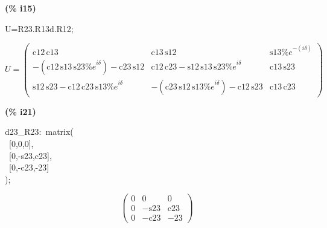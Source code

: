 \documentclass[fleqn]{article}
\begin{document}
\noindent
\begin{minipage}[t]{4.000000em}\color{red}\bfseries
(\% i15)	
\end{minipage}
\begin{minipage}[t]{\textwidth}\color{blue}
U=R23.R13d.R12;
\end{minipage}
\[\displaystyle \tag{\% o15} 
U\mathop{=}\begin{pmatrix}\ensuremath{\mathrm{c12}}\, \ensuremath{\mathrm{c13}} & \ensuremath{\mathrm{c13}}\, \ensuremath{\mathrm{s12}} & \ensuremath{\mathrm{s13}} {{\% e}^{-\left( i \delta \right) }}\\
\mathop{-}\left( \ensuremath{\mathrm{c12}}\, \ensuremath{\mathrm{s13}}\, \ensuremath{\mathrm{s23}} {{\% e}^{i \delta }}\right) \mathop{-}\ensuremath{\mathrm{c23}}\, \ensuremath{\mathrm{s12}} & \ensuremath{\mathrm{c12}}\, \ensuremath{\mathrm{c23}}\mathop{-}\ensuremath{\mathrm{s12}}\, \ensuremath{\mathrm{s13}}\, \ensuremath{\mathrm{s23}} {{\% e}^{i \delta }} & \ensuremath{\mathrm{c13}}\, \ensuremath{\mathrm{s23}}\\
\ensuremath{\mathrm{s12}}\, \ensuremath{\mathrm{s23}}\mathop{-}\ensuremath{\mathrm{c12}}\, \ensuremath{\mathrm{c23}}\, \ensuremath{\mathrm{s13}} {{\% e}^{i \delta }} & \mathop{-}\left( \ensuremath{\mathrm{c23}}\, \ensuremath{\mathrm{s12}}\, \ensuremath{\mathrm{s13}} {{\% e}^{i \delta }}\right) \mathop{-}\ensuremath{\mathrm{c12}}\, \ensuremath{\mathrm{s23}} & \ensuremath{\mathrm{c13}}\, \ensuremath{\mathrm{c23}}\end{pmatrix}\mbox{}
\]


\noindent
\begin{minipage}[t]{4.000000em}\color{red}\bfseries
(\% i21)	
\end{minipage}
\begin{minipage}[t]{\textwidth}\color{blue}
d23\_R23:\ matrix(\\
\ [0,0,0],\ \\
\ [0,-s23,c23],\ \\
\ [0,-c23,-23]\\
);
\end{minipage}
\[\displaystyle \tag{d23\_ R23} 
\begin{pmatrix}0 & 0 & 0\\
0 & \mathop{-}\ensuremath{\mathrm{s23}} & \ensuremath{\mathrm{c23}}\\
0 & \mathop{-}\ensuremath{\mathrm{c23}} & \mathop{-}23\end{pmatrix}\mbox{}
\]
\end{document}
